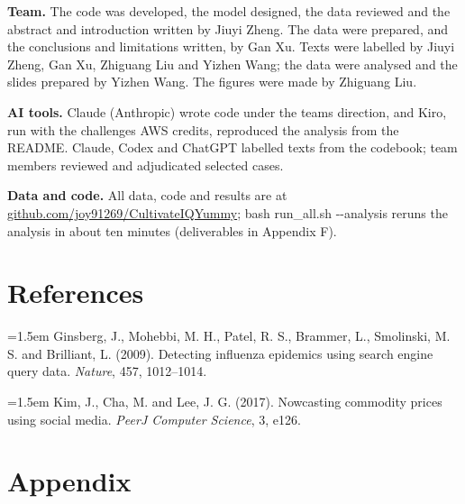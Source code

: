 \documentclass[
  11pt,
]{article}
\begin{document}
\textbf{Team.} The code was developed, the model designed, the data
reviewed and the abstract and introduction written by Jiuyi Zheng. The
data were prepared, and the conclusions and limitations written, by Gan
Xu. Texts were labelled by Jiuyi Zheng, Gan Xu, Zhiguang Liu and Yizhen
Wang; the data
were analysed and the slides prepared by Yizhen Wang. The figures were
made by Zhiguang Liu.

\textbf{AI tools.} Claude (Anthropic) wrote code under the team\textquotesingle s direction,
and Kiro, run with the challenge\textquotesingle s AWS credits, reproduced
the analysis from the README. Claude, Codex and ChatGPT labelled texts
from the codebook; team members reviewed and adjudicated selected cases.

\textbf{Data and code.} All data, code and results are at
\href{https://github.com/joy91269/CultivateIQYummy}{github.com/joy91269/CultivateIQYummy};
bash run\_all.sh -\/-analysis reruns the analysis in about ten minutes
(deliverables in Appendix F).

\section{References}\label{references}

\noindent\hangindent=1.5em Ginsberg, J., Mohebbi, M. H.,
Patel, R. S., Brammer, L., Smolinski, M. S. and Brilliant, L. (2009).
Detecting influenza epidemics using search engine query data.
\emph{Nature}, 457, 1012--1014.

\noindent\hangindent=1.5em Kim, J., Cha, M. and Lee, J. G.
(2017). Nowcasting commodity prices using social media. \emph{PeerJ
Computer Science}, 3, e126.

\clearpage

\section{Appendix}\label{appendix}
\end{document}
